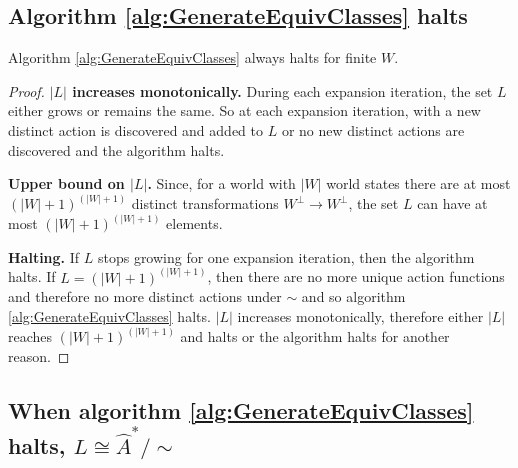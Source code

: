 \subsection{Algorithm \ref{alg:GenerateEquivClasses} halts}

\begin{proposition}
    Algorithm \ref{alg:GenerateEquivClasses} always halts for finite $W$.
\end{proposition}
\begin{proof}
    \textbf{$|L|$ increases monotonically.}
    During each expansion iteration, the set $L$ either grows or remains the same.
    So at each expansion iteration, with a new distinct action is discovered and added to $L$ or no new distinct actions are discovered and the algorithm halts.

    \textbf{Upper bound on $|L|$.}
    Since, for a world with $|W|$ world states there are at most $(|W| + 1)^(|W| + 1)$ distinct transformations $W^{\bot} \to W^{\bot}$, the set $L$ can have at most $(|W| + 1)^(|W| + 1)$ elements.

    \textbf{Halting.}
    If $L$ stops growing for one expansion iteration, then the algorithm halts.
    If $L = (|W| + 1)^(|W| + 1)$, then there are no more unique action functions and therefore no more distinct actions under $\sim$ and so  algorithm \ref{alg:GenerateEquivClasses} halts.
    $|L|$ increases monotonically, therefore either $|L|$ reaches $(|W| + 1)^(|W| + 1)$ and halts or the algorithm halts for another reason.
\end{proof}

\subsection{When algorithm \ref{alg:GenerateEquivClasses} halts, $L \cong \hat{A}^{*}/\sim$}


